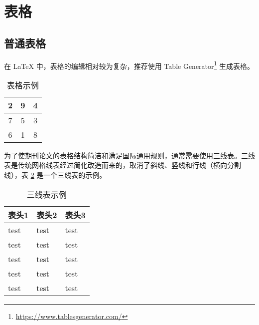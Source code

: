 \documentclass[report,oneside,UTF8,zihao=-4]{config}
\begin{document}
\section{表格}

\subsection{普通表格}

在 \LaTeX{} 中，表格的编辑相对较为复杂，推荐使用 Table Generator\footnote{\url{https://www.tablesgenerator.com/}} 生成表格。

\begin{table}[H] %
    \centering %
    \caption{表格示例} %
    \label{tab:example} %
    \renewcommand\arraystretch{2.5} %
    \setlength{\tabcolsep}{30pt} %
    \begin{tabular}{|c|c|c|}  %
        \hline %
        2 & 9 & 4 \\ %
        \hline %
        7 & 5 & 3 \\ %
        \hline %
        6 & 1 & 8 \\ %
        \hline %
    \end{tabular}
\end{table}

为了使期刊论文的表格结构简洁和满足国际通用规则，通常需要使用三线表。三线表是传统网格线表经过简化改造而来的，取消了斜线、竖线和行线（横向分割线），表 \ref{tab:three-line} 是一个三线表的示例。

\begin{table}[H] %
    \centering %
    \caption{三线表示例} %
    \label{tab:three-line} %
    \renewcommand\arraystretch{1.2} %
    \setlength{\tabcolsep}{10pt} %
    \begin{tabular}{lll} %
        \toprule[1.5pt] %
        \textbf{表头1} & \textbf{表头2} & \textbf{表头3} \\ %
        \midrule[0.8pt] %
            test & test & test \\ %
            test & test & test \\ %
            test & test & test \\ %
            test & test & test \\ %
            test & test & test \\ %
        \bottomrule[1.5pt] %
    \end{tabular}
\end{table}
\end{document}
